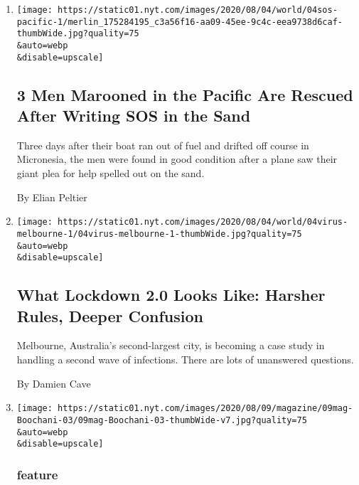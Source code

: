 \begin{enumerate}
\def\labelenumi{\arabic{enumi}.}
\item
  \href{/2020/08/04/world/australia/sos-pacific-island.html}{}

  \texttt{[image: https://static01.nyt.com/images/2020/08/04/world/04sos-pacific-1/merlin\_175284195\_c3a56f16-aa09-45ee-9c4c-eea9738d6caf-thumbWide.jpg?quality=75\\\&auto=webp\\\&disable=upscale]}

  \hypertarget{3-men-marooned-in-the-pacific-are-rescued-after-writing-sos-in-the-sand}{%
  \subsection{3 Men Marooned in the Pacific Are Rescued After Writing
  SOS in the
  Sand}\label{3-men-marooned-in-the-pacific-are-rescued-after-writing-sos-in-the-sand}}

  Three days after their boat ran out of fuel and drifted off course in
  Micronesia, the men were found in good condition after a plane saw
  their giant plea for help spelled out on the sand.

  By Elian Peltier
\item
  \href{/2020/08/04/world/australia/coronavirus-melbourne-lockdown.html}{}

  \texttt{[image: https://static01.nyt.com/images/2020/08/04/world/04virus-melbourne-1/04virus-melbourne-1-thumbWide.jpg?quality=75\\\&auto=webp\\\&disable=upscale]}

  \hypertarget{what-lockdown-20-looks-like-harsher-rules-deeper-confusion}{%
  \subsection{What Lockdown 2.0 Looks Like: Harsher Rules, Deeper
  Confusion}\label{what-lockdown-20-looks-like-harsher-rules-deeper-confusion}}

  Melbourne, Australia's second-largest city, is becoming a case study
  in handling a second wave of infections. There are lots of unanswered
  questions.

  By Damien Cave
\item
  \href{/2020/08/04/magazine/behrouz-boochani-australia.html}{}

  \texttt{[image: https://static01.nyt.com/images/2020/08/09/magazine/09mag-Boochani-03/09mag-Boochani-03-thumbWide-v7.jpg?quality=75\\\&auto=webp\\\&disable=upscale]}

  \hypertarget{feature}{%
  \subsubsection{feature}\label{feature}}


\end{enumerate}
